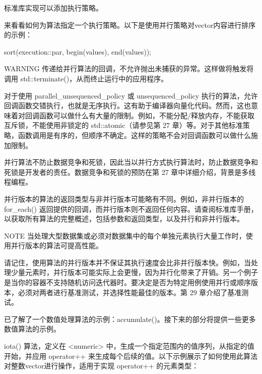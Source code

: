 标准库实现可以添加执行策略。

来看看如何为算法指定一个执行策略。以下是使用并行策略对vector内容进行排序的示例：

\begin{cpp}
sort(execution::par, begin(values), end(values));
\end{cpp}

\begin{myWarning}{WARNING}
传递给并行算法的回调，不允许抛出未捕获的异常。这样做将触发将调用 std::terminate()，从而终止运行中的应用程序。
\end{myWarning}

对于使用 parallel\_unsequenced\_policy 或 unsequenced\_policy 执行的算法，允许回调函数交错执行，也就是无序执行。这有助于编译器向量化代码。然而，这也意味着对回调函数可以做什么有大量的限制。例如，不能分配/释放内存，不能获取互斥锁，不能使用非锁定的 std::atomic（请参见第 27 章）等。对于其他标准策略，函数调用是有序的，但顺序不确定。这样的策略不会对回调函数可以做什么施加限制。

并行算法不防止数据竞争和死锁，因此当以并行方式执行算法时，防止数据竞争和死锁是开发者的责任。数据竞争和死锁的预防在第 27 章中详细介绍，背景是多线程编程。

并行版本的算法的返回类型与非并行版本可能略有不同。例如，非并行版本的 for\_each() 返回提供的回调，而并行版本则不返回任何内容。请查阅标准库手册，以获取所有算法的完整概述，包括参数和返回类型，以及并行和非并行版本。

\begin{myNotic}{NOTE}
当处理大型数据集或必须对数据集中的每个单独元素执行大量工作时，使用并行版本的算法可提高性能。
\end{myNotic}

请记住，使用算法的并行版本并不保证其执行速度会比非并行版本快。例如，当处理少量元素时，并行版本可能实际上会更慢，因为并行化带来了开销。另一个例子是当你的容器不支持随机访问迭代器时。要决定是否为特定用例使用并行或顺序版本，必须对两者进行基准测试，并选择性能最佳的版本。第 29 章介绍了基准测试。


已了解了一个数值处理算法的示例：accumulate()。接下来的部分将提供一些更多数值算法的示例。


iota() 算法，定义在 <numeric> 中，生成一个指定范围内的值序列，从指定的值开始，并应用 operator++ 来生成每个后续的值。以下示例展示了如何使用此算法对整数vector进行操作，适用于实现 operator++ 的元素类型：

